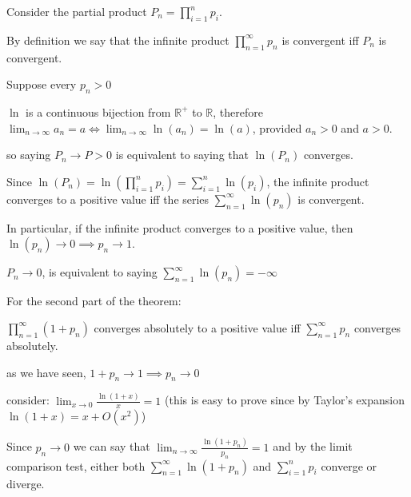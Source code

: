 \documentclass[12pt]{article}
\begin{document}
Consider the partial product $P_n = \prod_{i=1}^n p_i$.

By definition we say that the infinite product $\prod_{n=1}^\infty p_n$ is convergent iff $P_n$ is convergent.

Suppose every $p_n>0$

$\ln$ is a continuous bijection from $\mathbb{R}^+$ to $\mathbb{R}$, therefore
$\lim_{n\to \infty} a_n = a \iff \lim_{n\to \infty} \ln(a_n) = \ln(a)$, provided $a_n>0$ and $a>0$.

so saying $P_n\to P > 0$ is equivalent to saying that $\ln(P_n)$ converges.

Since $\ln(P_n) = \ln(\prod_{i=1}^n p_i) = \sum_{i=1}^n \ln(p_i)$, the infinite product converges to a positive value iff the series $\sum_{n=1}^\infty \ln(p_n)$ is convergent.

In particular, if the infinite product converges to a positive value, then $\ln(p_n)\to 0 \implies p_n \to 1$.

$P_n \to 0$, is equivalent to saying $\sum_{n=1}^\infty \ln(p_n) = -\infty$

For the second part of the theorem:

$\prod_{n=1}^\infty (1+p_n)$ converges absolutely to a positive value iff $\sum_{n=1}^\infty p_n$ converges absolutely.

as we have seen, $1+p_n \to 1 \implies p_n \to 0$

consider: $\lim_{x\to 0} \frac{\ln(1+x)}{x} = 1$ (this is easy to prove since by Taylor's expansion $\ln(1+x) = x + O(x^2)$)

Since $p_n \to 0$ we can say that $\lim_{n \to \infty} \frac{\ln(1+p_n)}{p_n} = 1$ and by the limit comparison test, either both $\sum_{n=1}^\infty \ln(1+p_n)$ and $\sum_{i=1}^n p_i$ converge or diverge.
\end{document}
